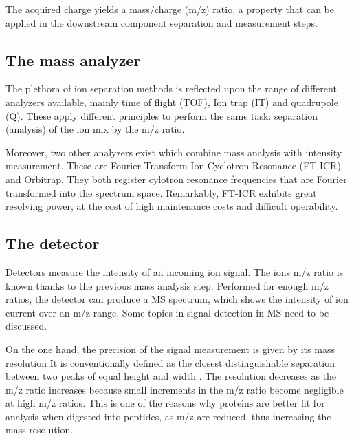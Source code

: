 \documentclass[11pt, a4paper]{report}
\begin{document}
The acquired charge yields a mass/charge (\ac{m/z}) ratio, a property that can be applied in the downstream component separation and measurement steps.

\subsection{The mass analyzer}
\label{subsec:the_mass_analyzer}

The plethora of ion separation methods is reflected upon the range of different analyzers available, mainly time of flight (\ac{TOF}), Ion trap (\ac{IT}) and quadrupole (\ac{Q}). These apply different principles to perform the same task: separation (analysis) of the ion mix by the \ac{m/z} ratio.

Moreover, two other analyzers exist which combine mass analysis with intensity measurement. These are Fourier Transform Ion Cyclotron Resonance (\ac{FT-ICR}) and Orbitrap. They both register cylotron resonance frequencies that are Fourier transformed into the spectrum space. Remarkably, \ac{FT-ICR} exhibits great resolving power, at the cost of high maintenance costs and difficult operability. 

\subsection{The detector}
\label{subsec:the_detector}

Detectors measure the intensity of an incoming ion signal. The ion\textquotesingle s \ac{m/z} ratio is known thanks to the previous mass analysis step. Performed for enough \ac{m/z} ratios, the detector can produce a \ac{MS} spectrum, which shows the intensity of ion current over an \ac{m/z} range. Some topics in signal detection in \ac{MS} need to be discussed.

On the one hand, the precision of the signal measurement is given by its mass resolution It is conventionally defined as the closest distinguishable separation between two peaks of equal height and width \cite{Marshall2013}. The resolution decreases as the \ac{m/z} ratio increases because small increments in the \ac{m/z} ratio become negligible at high \ac{m/z} ratios. This is one of the reasons why proteins are better fit for analysis when digested into peptides, as \ac{m/z} are reduced, thus increasing the mass resolution.
\end{document}
